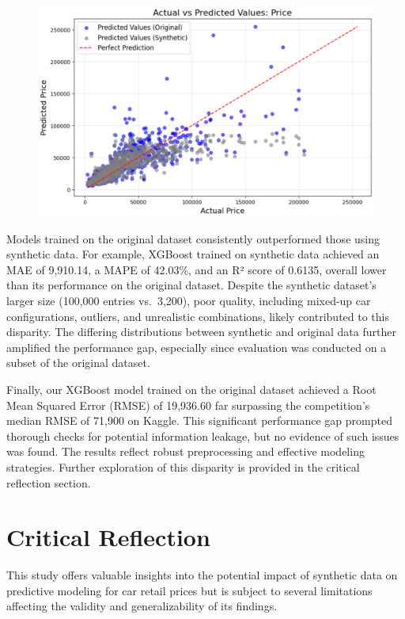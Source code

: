 \documentclass[a4paper,oneside,bibliography=totoc]{scrbook}
\begin{document}
\begin{figure}
	\includegraphics[width=\linewidth]{images/xgb_results_mixed.png}
	\centering
\end{figure}

Models trained on the original dataset consistently outperformed those using synthetic data. For example, XGBoost trained on synthetic data achieved an MAE of 9,910.14, a MAPE of 42.03\%, and an R² score of 0.6135, overall lower than its performance on the original dataset. Despite the synthetic dataset's larger size (100,000 entries vs.~3,200), poor quality, including mixed-up car configurations, outliers, and unrealistic combinations, likely contributed to this disparity. The differing distributions between synthetic and original data further amplified the performance gap, especially since evaluation was conducted on a subset of the original dataset.

Finally, our XGBoost model trained on the original dataset achieved a Root Mean Squared Error (RMSE) of 19,936.60 far surpassing the competition's median RMSE of 71,900 on Kaggle. This significant performance gap prompted thorough checks for potential information leakage, but no evidence of such issues was found. The results reflect robust preprocessing and effective modeling strategies. Further exploration of this disparity is provided in the critical reflection section.

\chapter{Critical Reflection}
\label{cha:criticalReflection}

This study offers valuable insights into the potential impact of synthetic data on predictive modeling for car retail prices but is subject to several limitations affecting the validity and generalizability of its findings.
\end{document}
